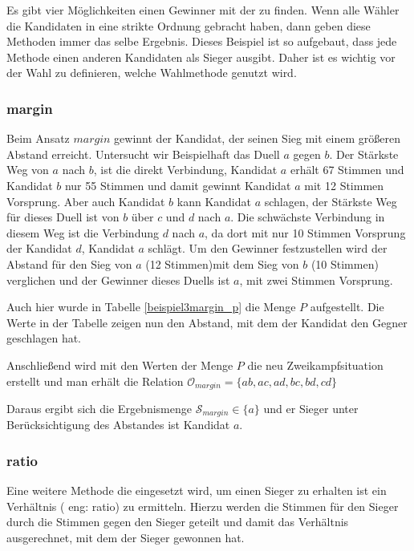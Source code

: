 Es gibt vier Möglichkeiten einen Gewinner mit der \schulze zu finden. Wenn alle Wähler die Kandidaten in eine strikte Ordnung gebracht haben, dann geben diese Methoden immer das selbe Ergebnis. Dieses Beispiel ist so aufgebaut, dass jede Methode einen anderen Kandidaten als Sieger ausgibt. Daher ist es wichtig vor der Wahl zu definieren, welche Wahlmethode genutzt wird.

\subsubsection{margin}
\label{sec:margin}
Beim Ansatz $margin$ gewinnt der Kandidat, der seinen Sieg mit einem größeren Abstand erreicht. 
Untersucht wir Beispielhaft das Duell $a$ gegen $b$. Der Stärkste Weg von $a$ nach $b$, ist die direkt Verbindung, Kandidat $a$ erhält 67 Stimmen und Kandidat $b$ nur 55 Stimmen und damit gewinnt Kandidat $a$ mit 12 Stimmen Vorsprung. 
Aber auch Kandidat $b$ kann Kandidat $a$ schlagen, der Stärkste Weg für dieses Duell ist von $b$ über $c$ und $d$ nach $a$. Die schwächste Verbindung in diesem Weg ist die Verbindung $d$ nach $a$, da dort mit nur 10 Stimmen Vorsprung der Kandidat $d$, Kandidat $a$ schlägt.
Um den Gewinner festzustellen wird der Abstand für den Sieg von $a$ (12 Stimmen)mit dem Sieg von $b$ (10 Stimmen) verglichen und der Gewinner dieses Duells ist $a$, mit zwei Stimmen Vorsprung.

Auch hier wurde in Tabelle \ref{beispiel3margin_p} die Menge $P$ aufgestellt. Die Werte in der Tabelle zeigen nun den Abstand, mit dem der Kandidat den Gegner geschlagen hat.



\newpage
Anschließend wird mit den Werten der Menge $P$ die neu Zweikampfsituation erstellt und man erhält die Relation $\mathcal{O}_{margin} = \{ ab, ac,ad,bc,bd,cd \}$

Daraus ergibt sich die Ergebnismenge $\mathcal{S}_{margin} \in \{ a\}$ und er Sieger unter Berücksichtigung des Abstandes ist Kandidat $a$.

\subsubsection{ratio}
\label{sec:ratio}
Eine weitere Methode die eingesetzt wird, um einen Sieger zu erhalten ist ein Verhältnis ( eng: ratio) zu ermitteln. Hierzu werden die Stimmen für den Sieger durch die Stimmen gegen den Sieger geteilt und damit das Verhältnis ausgerechnet, mit dem der Sieger gewonnen hat.

